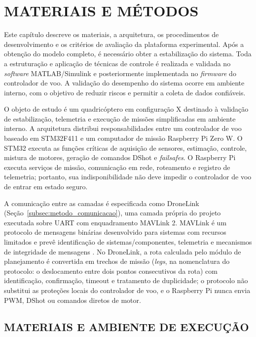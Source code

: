 \chapter{MATERIAIS E MÉTODOS}\label{cap:metodologia}

Este capítulo descreve os materiais, a arquitetura, os procedimentos de desenvolvimento e os critérios de avaliação da plataforma experimental. Após a obtenção do modelo completo, é necessário obter a estabilização do sistema. Toda a estruturação e aplicação de técnicas de controle é realizada e validada no \textit{software} MATLAB/Simulink e posteriormente implementada no \textit{firmware} do controlador de voo. A validação do desempenho do sistema ocorre em ambiente interno, com o objetivo de reduzir riscos e permitir a coleta de dados confiáveis.

O objeto de estudo é um quadricóptero em configuração X destinado à validação de estabilização, telemetria e execução de missões simplificadas em ambiente interno. A arquitetura distribui responsabilidades entre um controlador de voo baseado em STM32F411 e um computador de missão Raspberry Pi Zero W. O STM32 executa as funções críticas de aquisição de sensores, estimação, controle, mistura de motores, geração de comandos DShot e \textit{failsafes}. O Raspberry Pi executa serviços de missão, comunicação em rede, roteamento e registro de telemetria; portanto, sua indisponibilidade não deve impedir o controlador de voo de entrar em estado seguro.

A comunicação entre as camadas é especificada como DroneLink (Seção~\ref{subsec:metodo_comunicacao}), uma camada própria do projeto executada sobre UART com enquadramento MAVLink 2. MAVLink é um protocolo de mensagens binárias desenvolvido para sistemas com recursos limitados e prevê identificação de sistemas/componentes, telemetria e mecanismos de integridade de mensagens \cite{koubaa2019,mavlinkguide}. No DroneLink, a rota calculada pelo módulo de planejamento é convertida em trechos de missão (\textit{legs}, na nomenclatura do protocolo: o deslocamento entre dois pontos consecutivos da rota) com identificação, confirmação, timeout e tratamento de duplicidade; o protocolo não substitui as proteções locais do controlador de voo, e o Raspberry Pi nunca envia PWM, DShot ou comandos diretos de motor.

\section{MATERIAIS E AMBIENTE DE EXECUÇÃO}\label{sec:materiais_ambiente}

